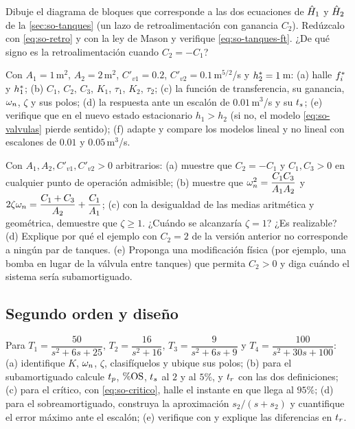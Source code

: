 \begin{problema}\label{prob:so-bloques-tanques}
Dibuje el diagrama de bloques que corresponde a las dos ecuaciones de $\hat{H}_1$ y $\hat{H}_2$ de la \cref{sec:so-tanques} (un lazo de retroalimentación con ganancia $C_2$). Redúzcalo con \eqref{eq:so-retro} y con la ley de Mason y verifique \eqref{eq:so-tanques-ft}. ¿De qué signo es la retroalimentación cuando $C_2=-C_1$?
\end{problema}

\begin{problema}\label{prob:so-tanques}
Con $A_1=1$\,m$^2$, $A_2=2$\,m$^2$, $C'_{v1}=0.2$, $C'_{v2}=0.1$\,m$^{5/2}$/s y $h_2^{*}=1$\,m: (a) halle $f_i^{*}$ y $h_1^{*}$; (b) $C_1$, $C_2$, $C_3$, $K_1$, $\tau_1$, $K_2$, $\tau_2$; (c) la función de transferencia, su ganancia, $\omega_n$, $\zeta$ y sus polos; (d) la respuesta ante un escalón de $0.01$\,m$^3$/s y su $t_s$; (e) verifique que en el nuevo estado estacionario $h_1>h_2$ (si no, el modelo \eqref{eq:so-valvulas} pierde sentido); (f) \etiquetaM{} adapte  y compare los modelos lineal y no lineal con escalones de $0.01$ y $0.05$\,m$^3$/s.
\end{problema}

\begin{problema}\label{prob:so-zeta-tanques}
\etiquetaEstrella{} Con $A_1,A_2,C'_{v1},C'_{v2}>0$ arbitrarios: (a) muestre que $C_2=-C_1$ y $C_1,C_3>0$ en cualquier punto de operación admisible; (b) muestre que $\omega_n^2=\dfrac{C_1C_3}{A_1A_2}$ y $2\zeta\omega_n=\dfrac{C_1+C_3}{A_2}+\dfrac{C_1}{A_1}$; (c) con la desigualdad de las medias aritmética y geométrica, demuestre que $\zeta\geq1$. ¿Cuándo se alcanzaría $\zeta=1$? ¿Es realizable? (d) Explique por qué el ejemplo con $C_2=2$ de la versión anterior no corresponde a ningún par de tanques. (e) Proponga una modificación física (por ejemplo, una bomba en lugar de la válvula entre tanques) que permita $C_2>0$ y diga cuándo el sistema sería subamortiguado.
\end{problema}

\subsection*{Segundo orden y diseño}

\begin{problema}\label{prob:so-cuatro}
Para $T_1=\dfrac{50}{s^2+6s+25}$, $T_2=\dfrac{16}{s^2+16}$, $T_3=\dfrac{9}{s^2+6s+9}$ y $T_4=\dfrac{100}{s^2+30s+100}$: (a) identifique $K$, $\omega_n$, $\zeta$, clasifíquelos y ubique sus polos; (b) para el subamortiguado calcule $t_p$, $\%\mathrm{OS}$, $t_s$ al $2$ y al $5\%$, y $t_r$ con las dos definiciones; (c) para el crítico, con \eqref{eq:so-critico}, halle el instante en que llega al $95\%$; (d) para el sobreamortiguado, construya la aproximación $s_2/(s+s_2)$ y cuantifique el error máximo ante el escalón; (e) \etiquetaM{} verifique con  y explique las diferencias en $t_r$.
\end{problema}

